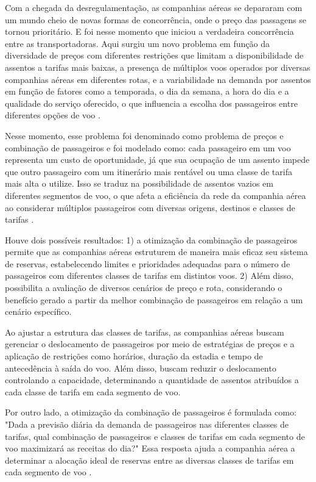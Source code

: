 Com a chegada da desregulamentação, as companhias aéreas se depararam com um mundo cheio de novas formas de concorrência, onde o preço das passagens se tornou prioritário. E foi nesse momento que iniciou a verdadeira concorrência entre as transportadoras. Aqui surgiu um novo problema em função da diversidade de preços com diferentes restrições que limitam a disponibilidade de assentos a tarifas mais baixas, a presença de múltiplos voos operados por diversas companhias aéreas em diferentes rotas, e a variabilidade na demanda por assentos em função de fatores como a temporada, o dia da semana, a hora do dia e a qualidade do serviço oferecido, o que influencia a escolha dos passageiros entre diferentes opções de voo \parencite{article_base}.

Nesse momento, esse problema foi denominado como problema de preços e combinação de passageiros e foi modelado como: cada passageiro em um voo representa um custo de oportunidade, já que sua ocupação de um assento impede que outro passageiro com um itinerário mais rentável ou uma classe de tarifa mais alta o utilize. Isso se traduz na possibilidade de assentos vazios em diferentes segmentos de voo, o que afeta a eficiência da rede da companhia aérea ao considerar múltiplos passageiros com diversas origens, destinos e classes de tarifas \parencite{article_base}.

Houve dois possíveis resultados: 1) a otimização da combinação de passageiros permite que as companhias aéreas estruturem de maneira mais eficaz seu sistema de reservas, estabelecendo limites e prioridades adequadas para o número de passageiros com diferentes classes de tarifas em distintos voos. 2) Além disso, possibilita a avaliação de diversos cenários de preço e rota, considerando o benefício gerado a partir da melhor combinação de passageiros em relação a um cenário específico.

Ao ajustar a estrutura das classes de tarifas, as companhias aéreas buscam gerenciar o deslocamento de passageiros por meio de estratégias de preços e a aplicação de restrições como horários, duração da estadia e tempo de antecedência à saída do voo. Além disso, buscam reduzir o deslocamento controlando a capacidade, determinando a quantidade de assentos atribuídos a cada classe de tarifa em cada segmento de voo.

Por outro lado, a otimização da combinação de passageiros é formulada como: "Dada a previsão diária da demanda de passageiros nas diferentes classes de tarifas, qual combinação de passageiros e classes de tarifas em cada segmento de voo maximizará as receitas do dia?" Essa resposta ajuda a companhia aérea a determinar a alocação ideal de reservas entre as diversas classes de tarifas em cada segmento de voo \parencite{article_base}.

